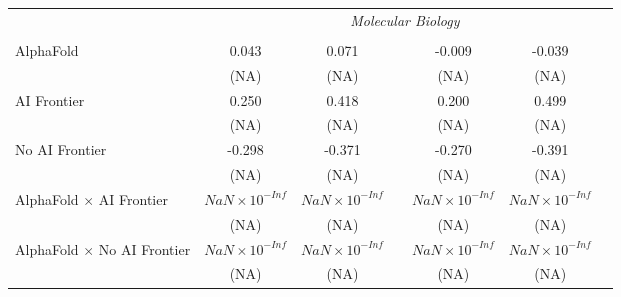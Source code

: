 \begin{tabular}{lcccccc}
 & \multicolumn{6}{c}{\textit{Molecular Biology}} \\ \\
   AlphaFold                                                                  & 0.043                  & 0.071                  &                        & -0.009                 & -0.039                 &   \\   
                                                                              & (NA)                   & (NA)                   &                        & (NA)                   & (NA)                   &   \\   
   AI Frontier                                                                & 0.250                  & 0.418                  &                        & 0.200                  & 0.499                  &   \\   
                                                                              & (NA)                   & (NA)                   &                        & (NA)                   & (NA)                   &   \\   
   No AI Frontier                                                             & -0.298                 & -0.371                 &                        & -0.270                 & -0.391                 &   \\   
                                                                              & (NA)                   & (NA)                   &                        & (NA)                   & (NA)                   &   \\   
   AlphaFold $\times$ AI Frontier                                             & $NaN\times 10^{-Inf}$  & $NaN\times 10^{-Inf}$  &                        & $NaN\times 10^{-Inf}$  & $NaN\times 10^{-Inf}$  &   \\   
                                                                              & (NA)                   & (NA)                   &                        & (NA)                   & (NA)                   &   \\   
   AlphaFold $\times$ No AI Frontier                                          & $NaN\times 10^{-Inf}$  & $NaN\times 10^{-Inf}$  &                        & $NaN\times 10^{-Inf}$  & $NaN\times 10^{-Inf}$  &   \\   
                                                                              & (NA)                   & (NA)                   &                        & (NA)                   & (NA)                   &   \\   

\end{tabular}
